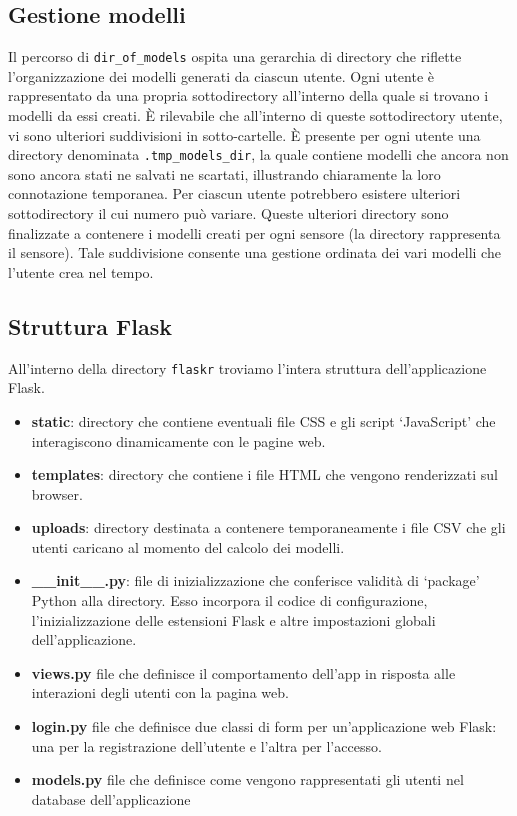 \documentclass[a4paper,10pt]{article}
\begin{document}
\subsection{Gestione modelli}
Il percorso di \texttt{dir\_of\_models} ospita una gerarchia di directory che riflette l'organizzazione dei modelli generati da ciascun utente. 
Ogni utente è rappresentato da una propria sottodirectory all'interno della quale si trovano i modelli da essi creati. 
È rilevabile che all'interno di queste sottodirectory utente, vi sono ulteriori suddivisioni in sotto-cartelle. È presente per ogni utente
una directory denominata \texttt{.tmp\_models\_dir}, la quale contiene modelli che ancora non sono ancora stati ne salvati ne scartati, illustrando chiaramente
la loro connotazione temporanea. Per ciascun utente potrebbero esistere ulteriori sottodirectory il cui numero può variare.
Queste ulteriori directory sono finalizzate a contenere i modelli creati per ogni sensore (la directory rappresenta il sensore).
Tale suddivisione consente una gestione ordinata dei vari modelli che l'utente crea nel tempo.

\subsection{Struttura Flask}
All'interno della directory \texttt{flaskr} troviamo l'intera struttura dell'applicazione Flask.
\begin{itemize}
  \item \textbf{static}: directory che contiene eventuali file CSS e gli script `JavaScript' che interagiscono dinamicamente con le pagine web.
  \item \textbf{templates}: directory che contiene i file HTML che vengono renderizzati sul browser.
  \item \textbf{uploads}: directory destinata a contenere temporaneamente i file CSV che gli utenti caricano al momento del calcolo dei modelli.
  \item \textbf{\_\_init\_\_.py}: file di inizializzazione che conferisce validità di `package' Python alla directory. 
  Esso incorpora il codice di configurazione, l'inizializzazione delle estensioni Flask e altre impostazioni globali dell'applicazione.
  \item \textbf{views.py} file che definisce il comportamento dell'app in risposta alle interazioni degli utenti con la pagina web.
  \item \textbf{login.py} file che definisce due classi di form per un'applicazione web Flask: una per la registrazione dell'utente e l'altra per l'accesso.
  \item \textbf{models.py} file che definisce come vengono rappresentati gli utenti nel database dell'applicazione
\end{itemize}
\end{document}
